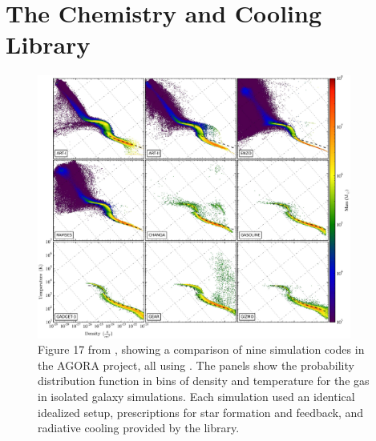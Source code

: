 \section{The \grackle{} Chemistry and Cooling Library}

\begin{figure}[h]
\begin{center}
\includegraphics[width=0.92\textwidth]{figures/fig17.eps}
\caption{Figure 17 from \citet{2016ApJ...833..202K}, showing a
  comparison of nine simulation codes in the AGORA project, all using
  \grackle{}.  The panels show the probability distribution function
  in bins of density and temperature for the gas in isolated galaxy
  simulations.  Each simulation used an identical idealized setup,
  prescriptions for star formation and feedback, and radiative cooling
  provided by the \grackle{} library.}
\label{fig:AGORA}
\end{center}
\vspace*{-2\baselineskip}
\end{figure}

